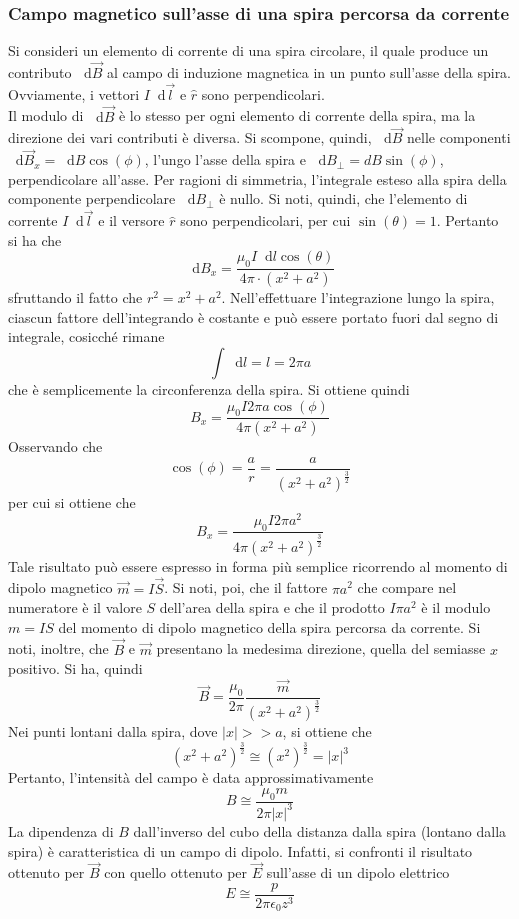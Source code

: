 \documentclass[a4paper]{extarticle}
\newcommand\dif{\mathop{}\!\mathrm{d}}
\begin{document}
\subsubsection{Campo magnetico sull'asse di una spira percorsa da corrente}
Si consideri un elemento di corrente di una spira circolare, il quale produce un contributo $\dif \vec B$ al campo di induzione magnetica in un punto sull'asse della spira. Ovviamente, i vettori $I \dif \vec l$ e $\hat r$ sono perpendicolari.\\
Il modulo di $\dif \vec B$ è lo stesso per ogni elemento di corrente della spira, ma la direzione dei vari contributi è diversa. Si scompone, quindi, $\dif \vec B$ nelle componenti $\dif \vec B_x = \dif B \cos(\phi)$, l'ungo l'asse della spira e $\dif B_\perp = dB \sin(\phi)$, perpendicolare all'asse. Per ragioni di simmetria, l'integrale esteso alla spira della componente perpendicolare $\dif B_\perp$ è nullo. Si noti, quindi, che l'elemento di corrente $I \dif \vec l$ e il versore $\hat r$ sono perpendicolari, per cui $\sin(\theta)=1$. Pertanto si ha che
\[\dif B_x = \dfrac{\mu_0 I \dif l \cos(\theta)}{4 \pi \cdot \left(x^2+a^2\right)}\]
sfruttando il fatto che $r^2=x^2+a^2$. Nell'effettuare l'integrazione lungo la spira, ciascun fattore dell'integrando è costante e può essere portato fuori dal segno di integrale, cosicché rimane
\[\int \dif l = l = 2 \pi a\]
che è semplicemente la circonferenza della spira. Si ottiene quindi
\[B_x=\dfrac{\mu_0 I 2 \pi a \cos(\phi)}{4 \pi (x^2+a^2)}\]
Osservando che
\[\cos(\phi) = \dfrac{a}{r} = \dfrac{a}{(x^2+a^2)^{\frac{3}{2}}}\]
per cui si ottiene che
\[B_x = \dfrac{\mu_0 I 2 \pi a^2}{4 \pi (x^2+a^2)^{\frac{3}{2}}}\]
Tale risultato può essere espresso in forma più semplice ricorrendo al momento di dipolo magnetico $\vec m = I \vec S$. Si noti, poi, che il fattore $\pi a^2$ che compare nel numeratore è il valore $S$ dell'area della spira e che il prodotto $I\pi a^2$ è il modulo $m=IS$ del momento di dipolo magnetico della spira percorsa da corrente. Si noti, inoltre, che $\vec B$ e $\vec m$ presentano la medesima direzione, quella del semiasse $x$ positivo. Si ha, quindi
\[\vec B = \dfrac{\mu_0}{2\pi} \dfrac{\vec m}{(x^2+a^2)^{\frac{3}{2}}}\]
Nei punti lontani dalla spira, dove $\vert x\vert >> a$, si ottiene che
\[(x^2+a^2)^{\frac{3}{2}} \cong (x^2)^{\frac{3}{2}} = \vert x\vert^3\]
Pertanto, l'intensità del campo è data approssimativamente
\[B \cong \dfrac{\mu_0 m}{2 \pi \vert x \vert^3}\]
La dipendenza di $B$ dall'inverso del cubo della distanza dalla spira (lontano dalla spira) è caratteristica di un campo di dipolo. Infatti, si confronti il risultato ottenuto per $\vec B$ con quello ottenuto per $\vec E$ sull'asse di un dipolo elettrico
\[E \cong \dfrac{p}{2 \pi \epsilon_0 z^3}\]
\end{document}
